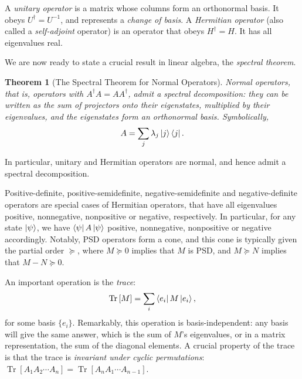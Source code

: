 \documentclass[10pt, a4paper]{article}
\numberwithin{equation}{section} %
\newcounter{stmt} %
\theoremstyle{definition}
\theoremstyle{plain}
\newtheorem{theorem}[stmt]{Theorem}
\newcommand{\?}{\mathrel{?}} %
\newcommand{\Tr}[2][]{\mathop{\mathrm{Tr}#1}\left[ #2 \right]} %
\begin{document}
\begin{appendices}
                  A \emph{unitary operator} is a matrix whose columns form an orthonormal basis. It obeys \(U^{\dagger} = U^{-1}\), and represents a \emph{change of basis}. A \emph{Hermitian operator} (also called a \emph{self-adjoint} operator) is an operator that obeys \(H^{\dagger} = H\). It has all eigenvalues real.

                    We are now ready to state a crucial result in linear algebra, the \emph{spectral theorem}.
                    \begin{theorem}[The Spectral Theorem for Normal Operators]
                      Normal operators, that is, operators with \(A^{\dagger}A = AA^{\dagger}\), admit a \emph{spectral decomposition}: they can be written as the sum of projectors onto their eigenstates, multiplied by their eigenvalues, and the eigenstates form an orthonormal basis. Symbolically,
                      \begin{equation}
                        A = \sum_j \lambda_j \ket{j}\bra{j}.
                      \end{equation}
                    \end{theorem}
                    In particular, unitary and Hermitian operators are normal, and hence admit a spectral decomposition.

                    Positive-definite, positive-semidefinite, negative-semidefinite and negative-definite operators are special cases of Hermitian operators, that have all eigenvalues positive, nonnegative, nonpositive or negative, respectively. In particular, for any state \(\ket{\psi}\), we have \(\bra{\psi}A\ket{\psi}\) positive, nonnegative, nonpositive or negative accordingly. Notably, PSD operators form a cone, and this cone is typically given the partial order \(\succeq\), where \(M \succeq 0\) implies that \(M\) is PSD, and \(M \succeq N\) implies that \(M-N \succeq 0\). 

                    An important operation is the \emph{trace}:
                    \begin{equation}
                      \Tr{M} = \sum_i \bra{e_i}M\ket{e_i},
                    \end{equation}
                    for some basis \(\{e_i\}\). Remarkably, this operation is basis-independent: any basis will give the same answer, which is the sum of \(M\)'s eigenvalues, or in a matrix representation, the sum of the diagonal elements. A crucial property of the trace is that the trace is \emph{invariant under cyclic permutations}: \(\Tr{A_1 A_2 \cdots A_n} = \Tr{A_n A_1 \cdots A_{n-1}}\).


\end{appendices}
\end{document}
